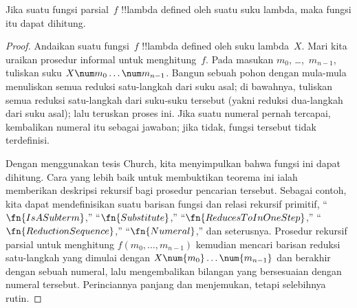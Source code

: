 \documentclass[../../../include/open-logic-section]{subfiles}
\begin{document}

\begin{thm}
Jika suatu fungsi parsial~$f$ !!{lambda defined} oleh suatu suku lambda, maka
fungsi itu dapat dihitung.
\end{thm}

\begin{proof}
Andaikan suatu fungsi~$f$ !!{lambda defined} oleh suku lambda~$X$. Mari kita
uraikan prosedur informal untuk menghitung~$f$. Pada masukan $m_0$,
\dots,~$m_{n-1}$, tuliskan suku $X \num m_0 \ldots \num m_{n-1}$. Bangun
sebuah pohon dengan mula-mula menuliskan semua reduksi satu-langkah dari suku
asal; di bawahnya, tuliskan semua reduksi satu-langkah dari suku-suku tersebut
(yakni reduksi dua-langkah dari suku asal); lalu teruskan proses ini. Jika suatu
numeral pernah tercapai, kembalikan numeral itu sebagai jawaban; jika tidak,
fungsi tersebut tidak terdefinisi.

Dengan menggunakan tesis Church, kita menyimpulkan bahwa fungsi ini dapat
dihitung. Cara yang lebih baik untuk membuktikan teorema ini ialah memberikan
deskripsi rekursif bagi prosedur pencarian tersebut. Sebagai contoh, kita dapat
mendefinisikan suatu barisan fungsi dan relasi rekursif primitif,
``$\fn{IsASubterm}$,'' ``$\fn{Substitute}$,''
``$\fn{ReducesToInOneStep}$,'' ``$\fn{ReductionSequence}$,''
``$\fn{Numeral}$,'' dan seterusnya. Prosedur rekursif parsial untuk menghitung
$f(m_0, \dots, m_{n-1})$ kemudian mencari barisan reduksi satu-langkah yang
dimulai dengan $X \num{m_0} \dots \num{m_{n-1}}$ dan berakhir dengan sebuah
numeral, lalu mengembalikan bilangan yang bersesuaian dengan numeral tersebut.
Perinciannya panjang dan menjemukan, tetapi selebihnya rutin.
\end{proof}
\end{document}
